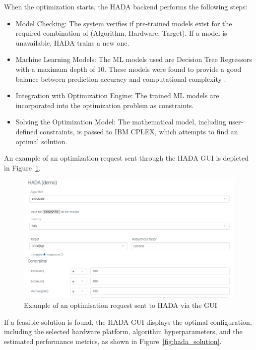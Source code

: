 \documentclass[a4paper,singleside,12pt]{report} %
\begin{document}
When the optimization starts, the HADA backend performs the following steps:
\begin{itemize}
    \item Model Checking: The system verifies if pre-trained models exist for the required combination of (Algorithm, Hardware, Target). If a model is unavailable, HADA trains a new one.
    \item Machine Learning Models: The ML models used are Decision Tree Regressors with a maximum depth of 10. These models were found to provide a good balance between prediction accuracy and computational complexity \cite{DEFILIPPO2022109199}.
    \item Integration with Optimization Engine: The trained ML models are incorporated into the optimization problem as constraints.
    \item Solving the Optimization Model: The mathematical model, including user-defined constraints, is passed to IBM CPLEX, which attempts to find an optimal solution.
\end{itemize}

An example of an optimization request sent through the HADA GUI is depicted in Figure~\ref{fig:hada_optimisation_req}.

\begin{figure}[h!]
    \centering
    \includegraphics[width=\textwidth]{imgs/HADA-optimisation-req.png}
    \caption{Example of an optimisation request sent to HADA via the GUI}
    \label{fig:hada_optimisation_req}
\end{figure}

If a feasible solution is found, the HADA GUI displays the optimal configuration, including the selected hardware platform, algorithm hyperparameters, and the estimated performance metrics, as shown in Figure~\ref{fig:hada_solution}.
\end{document}
